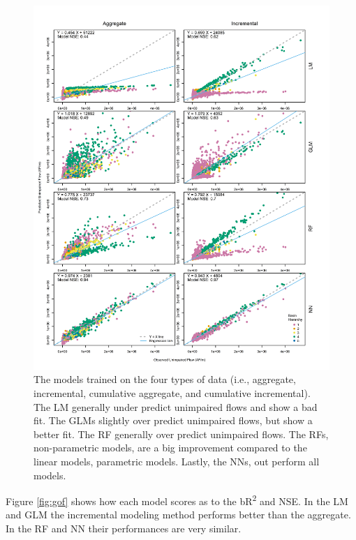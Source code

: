 \begin{figure}
  	\centering
 	\includegraphics[width=\textwidth, trim={0 0 0 0}, clip=true]{plots/rplot27_obsvspred_all.png}
	\caption{The models trained on the four types of data (i.e., aggregate, incremental, cumulative aggregate, and cumulative incremental). The LM generally under predict unimpaired flows and show a bad fit. The GLMs slightly over predict unimpaired flows, but show a better fit. The RF generally over predict unimpaired flows. The RFs, non-parametric models, are a big improvement compared to the linear models, parametric models. Lastly, the NNs, out perform all models.}
	\label{fig:obsvpred}
\end{figure}

Figure \ref{fig:gof} shows how each model scores as to the bR\textsuperscript{2} and NSE. In the LM and GLM the incremental modeling method performs better than the aggregate. In the RF and NN their performances are very similar.

